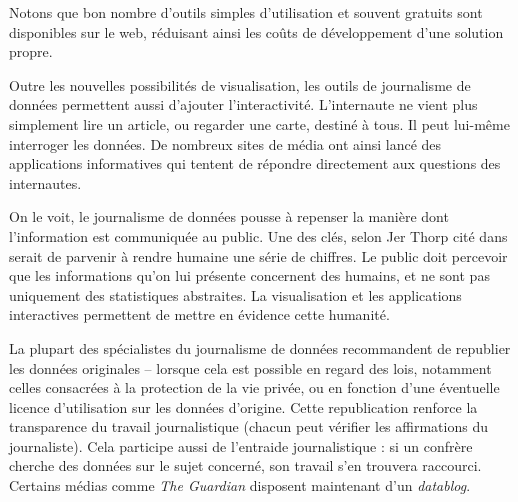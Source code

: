 Notons que bon nombre d'outils simples d'utilisation et souvent gratuits sont 
disponibles sur le web, réduisant ainsi les coûts de développement d'une solution
propre.


Outre les nouvelles possibilités de visualisation, les outils de journalisme de
données permettent aussi d'ajouter l'interactivité. L'internaute ne vient plus
simplement lire un article, ou regarder une carte, destiné à tous. Il peut lui-même
interroger les données. De nombreux sites de média ont ainsi lancé des 
applications informatives qui tentent de répondre directement aux questions des internautes.

On le voit, le journalisme de données pousse à repenser la manière dont l'information 
est communiquée au public. Une des clés, selon Jer Thorp cité dans \cite{handbookfr} 
serait de parvenir à rendre \og humaine \fg une série de chiffres. Le public doit 
percevoir que les informations qu'on lui présente concernent des humains, et ne sont 
pas uniquement des statistiques abstraites. La visualisation et les applications 
interactives permettent de mettre en évidence cette humanité. 

La plupart des spécialistes du journalisme de données recommandent de republier les
données originales -- lorsque cela est possible en regard des lois, notamment celles 
consacrées à la protection de la vie privée, ou en fonction d'une éventuelle licence
d'utilisation sur les données d'origine. Cette republication renforce la transparence
du travail journalistique (chacun peut vérifier les affirmations du journaliste).
Cela participe aussi de l'entraide journalistique : si un confrère cherche des données
sur le sujet concerné, son travail s'en trouvera raccourci. Certains médias comme \textit{The Guardian} disposent maintenant d'un \textit{datablog}.

